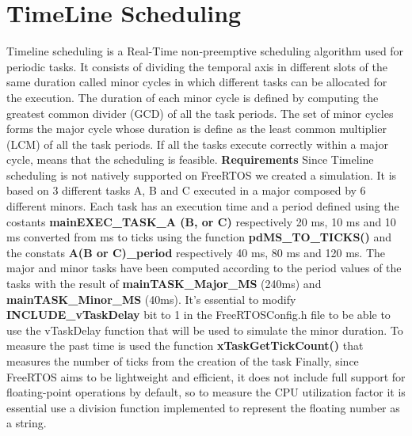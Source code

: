 \documentclass[9pt, reqno]{amsart}
\theoremstyle{definition}
\theoremstyle{remark}
\numberwithin{equation}{section}
\begin{document}
{\section{TimeLine Scheduling}
Timeline scheduling is a Real-Time non-preemptive scheduling algorithm used for periodic tasks. It consists of dividing the temporal axis in different slots of the same duration called minor cycles in which different tasks can be allocated for the execution.
The duration of each minor cycle is defined by computing the greatest common divider (GCD) of all the task periods. The set of minor cycles forms the major cycle whose duration is define as the least common multiplier (LCM) of all the task periods.
If all the tasks execute correctly within a major cycle, means that the scheduling is feasible.\newline
\textbf{Requirements}\newline
Since Timeline scheduling is not natively supported on FreeRTOS we created a simulation. It is based on 3 different tasks A, B and C executed in a major composed by 6 different minors.
Each task has an execution time and a period defined using the costants \textbf{mainEXEC\_TASK\_A (B, or C)} respectively 20 ms, 10 ms and 10 ms converted from ms to ticks using the function \textbf{pdMS\_TO\_TICKS()} and the constats \textbf{A(B or C)\_period} respectively 40 ms, 80 ms and 120 ms.
The major and minor tasks have been computed according to the period values of the tasks with the result of \textbf{mainTASK\_Major\_MS} (240ms) and \textbf{mainTASK\_Minor\_MS} (40ms).
It’s essential to modify \textbf{INCLUDE\_vTaskDelay} bit to 1 in the FreeRTOSConfig.h file to be able to use the vTaskDelay function that will be used to simulate the minor duration.
To measure the past time is used the function \textbf{xTaskGetTickCount()} that measures the number of ticks from the creation of the task 
Finally, since FreeRTOS aims to be lightweight and efficient, it does not include full support for floating-point operations by default, so to measure the CPU utilization factor it is essential use a division function implemented to represent the floating number as a string.
}
\end{document}
